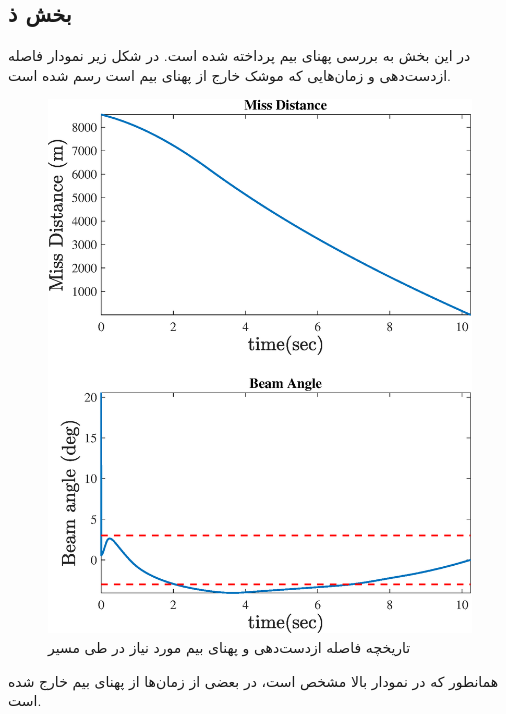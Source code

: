 \subsection{بخش ذ}
در این بخش به بررسی پهنای بیم پرداخته شده است. در شکل زیر نمودار فاصله ازدست‌دهی و زمان‌هایی که موشک خارج از پهنای بیم است رسم شده است.

\begin{figure}[H]
	\centering
	\includegraphics[width=.75\linewidth]{../Figure/k/miss_distance}
	\caption{تاریخچه فاصله ازدست‌دهی و پهنای بیم مورد نیاز در طی مسیر}
\end{figure}
همانطور که در نمودار بالا مشخص است، در بعضی از زمان‌ها از پهنای بیم خارج شده است.